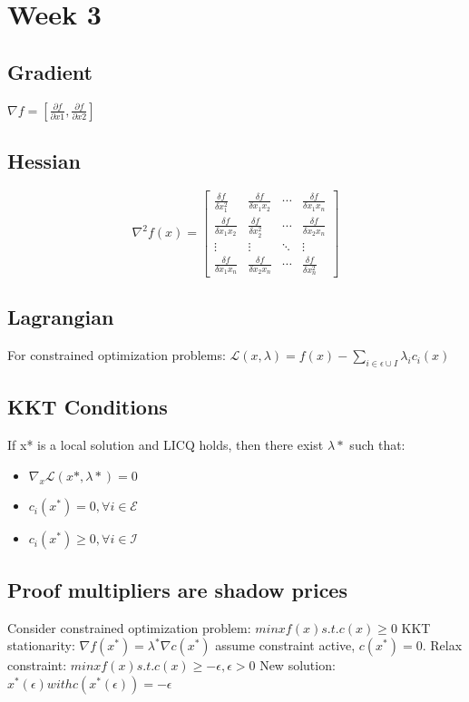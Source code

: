 \section{Week 3}

\subsection{Gradient}
$\nabla f = [\frac{\partial f}{\partial x1}, \frac{\partial f}{\partial x2}]$


\subsection{Hessian}
\begin{equation}
   \nabla^2 f(x) = \begin{bmatrix}
    \frac{\delta f}{\delta x_1^2} & \frac{\delta f}{\delta x_1 x_2} & \cdots & \frac{\delta f}{\delta x_1 x_n} \\
    \frac{\delta f}{\delta x_1 x_2} & \frac{\delta f}{\delta x_2^2} & \cdots & \frac{\delta f}{\delta x_2 x_n} \\
    \vdots & \vdots & \ddots & \vdots \\
    \frac{\delta f}{\delta x_1 x_n} & \frac{\delta f}{\delta x_2 x_n} & \cdots & \frac{\delta f}{\delta x_n^2}
   \end{bmatrix}
\end{equation}
\subsection{Lagrangian}
For constrained optimization problems:
$\mathcal{L}(x,\lambda) = f(x) - \sum_{i \in \epsilon \cup I} \lambda_i c_i(x)$
\subsection{KKT Conditions}
If x* is a local solution and LICQ holds, then there exist $\lambda*$ such that:
\begin{itemize}
    \item $\nabla_x \mathcal{L}(x*,\lambda*) = 0$
    \item $c_i(x^*) = 0, \forall i \in \mathcal{E}$
    \item $c_i(x^*) \geq 0, \forall i \in \mathcal{I}$
\end{itemize}

\subsection{Proof multipliers are shadow prices}
Consider constrained optimization problem: $min x f(x) s.t. c(x) \geq 0$
KKT stationarity: $\nabla f(x^*) = \lambda^* \nabla c(x^*)$ assume constraint active, $c(x^*) = 0$.
Relax constraint: $min x f(x) s.t. c(x) \geq -\epsilon, \epsilon>0$
New solution: $x^*(\epsilon) with c(x^*(\epsilon))=-\epsilon$

